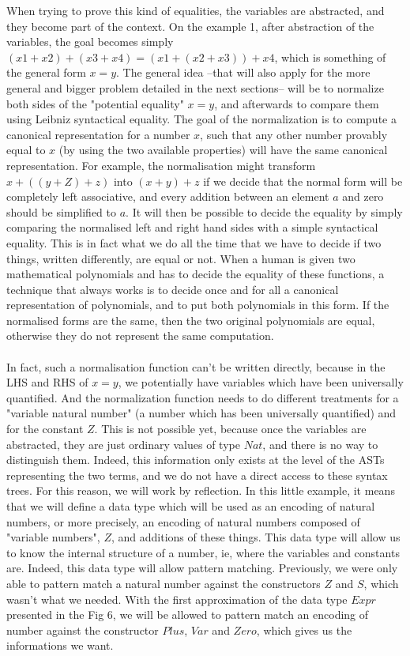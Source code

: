 When trying to prove this kind of equalities, the variables are abstracted, and they become part of the context. On the example 1, after abstraction of the variables, the goal becomes simply $(x1 + x2) + (x3 + x4) = (x1 + (x2 + x3)) + x4$, which is something of the general form $x=y$.
The general idea --that will also apply for the more general and bigger problem detailed in the next sections-- will be to normalize both sides of the "potential equality" $x=y$, and afterwards to compare them using Leibniz syntactical equality.
The goal of the normalization is to compute a canonical representation for a number $x$, such that any other number provably equal to $x$ (by using the two available properties) will have the same canonical representation. For example, the normalisation might transform $x+((y+Z)+z)$ into $(x+y)+z$ if we decide that the normal form will be completely left associative, and every addition between an element $a$ and zero should be simplified to $a$. It will then be possible to decide the equality by simply comparing the normalised left and right hand sides with a simple syntactical equality. This is in fact what we do all the time that we have to decide if two things, written differently, are equal or not. When a human is given two mathematical polynomials and has to decide the equality of these functions, a technique that always works is to decide once and for all a canonical representation of polynomials, and to put both polynomials in this form. If the normalised forms are the same, then the two original polynomials are equal, otherwise they do not represent the same computation.\\
\\
In fact, such a normalisation function can't be written directly, because in the LHS and RHS of $x=y$, we potentially have variables which have been universally quantified. And the normalization function needs to do different treatments for a "variable natural number" (a number which has been universally quantified) and for the constant $Z$. This is not possible yet, because once the variables are abstracted, they are just ordinary values of type $Nat$, and there is no way to distinguish them. Indeed, this information only exists at the level of the ASTs representing the two terms, and we do not have a direct access to these syntax trees.
For this reason, we will work by reflection. In this little example, it means that we will define a data type which will be used as an encoding of natural numbers, or more precisely, an encoding of natural numbers composed of "variable numbers", $Z$, and additions of these things. This data type will allow us to know the internal structure of a number, ie, where the variables and constants are.
Indeed, this data type will allow pattern matching. Previously, we were only able to pattern match a natural number against the constructors $Z$ and $S$, which wasn't what we needed.  With the first approximation of the data type $Expr$ presented in the Fig 6, we will be allowed to pattern match an encoding of number against the constructor $Plus$, $Var$ and $Zero$, which gives us the informations we want.


